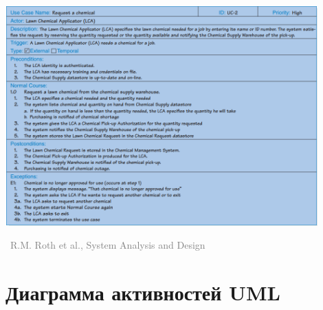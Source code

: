 \documentclass[xetex,mathserif,serif]{beamer}
\newcommand{\attribution}[1] {
	\vspace{-5mm}\begin{flushright}\begin{scriptsize}\textcolor{gray}{\textcopyright\, #1}\end{scriptsize}\end{flushright}
}
\begin{document}
	\begin{frame}
		\begin{center}
			\includegraphics[width=0.9\textwidth]{useCaseExample.png}
			\attribution{R.M. Roth et al., System Analysis and Design}
		\end{center}
	\end{frame}

	\section{Диаграмма активностей UML}
\end{document}

